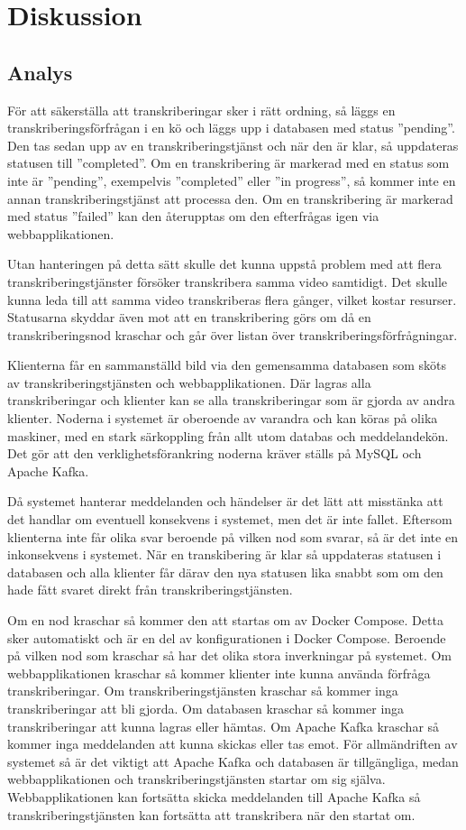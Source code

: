 \chapter{Diskussion}

\section{Analys}
För att säkerställa att transkriberingar sker i rätt ordning, så läggs en
transkriberingsförfrågan i en kö och läggs upp i databasen med status
''pending''. Den tas sedan upp av en transkriberingstjänst och när den är
klar, så uppdateras statusen till ''completed''. Om en transkribering är
markerad med en status som inte är ''pending'', exempelvis ''completed'' eller
''in progress'', så kommer inte en annan transkriberingstjänst att processa
den. Om en transkribering är markerad med status ''failed'' kan den återupptas
om den efterfrågas igen via webbapplikationen.

Utan hanteringen på detta sätt skulle det kunna uppstå problem med att flera
transkriberingstjänster försöker transkribera samma video samtidigt. Det
skulle kunna leda till att samma video transkriberas flera gånger, vilket
kostar resurser. Statusarna skyddar även mot att en transkribering görs om
då en transkriberingsnod kraschar och går över listan över
transkriberingsförfrågningar.

Klienterna får en sammanställd bild via den gemensamma databasen som sköts av
transkriberingstjänsten och webbapplikationen. Där lagras alla
transkriberingar och klienter kan se alla transkriberingar som är gjorda av
andra klienter. Noderna i systemet är oberoende av varandra
och kan köras på olika maskiner, med en stark särkoppling från allt utom
databas och meddelandekön. Det gör att den verklighetsförankring noderna
kräver ställs på MySQL och Apache Kafka.

Då systemet hanterar meddelanden och händelser är det lätt att misstänka att
det handlar om eventuell konsekvens i systemet, men det är inte fallet. 
Eftersom klienterna inte får olika svar beroende på vilken nod som svarar, så
är det inte en inkonsekvens i systemet. När en transkibering är klar så
uppdateras statusen i databasen och alla klienter får därav den nya statusen
lika snabbt som om den hade fått svaret direkt från transkriberingstjänsten.

Om en nod kraschar så kommer den att startas om av Docker Compose. Detta
sker automatiskt och är en del av konfigurationen i Docker Compose. Beroende
på vilken nod som kraschar så har det olika stora inverkningar på systemet.
Om webbapplikationen kraschar så kommer klienter inte kunna använda förfråga
transkriberingar. Om transkriberingstjänsten kraschar så kommer inga 
transkriberingar att bli gjorda. Om databasen kraschar så kommer inga
transkriberingar att kunna lagras eller hämtas. Om Apache Kafka kraschar så
kommer inga meddelanden att kunna skickas eller tas emot. För allmändriften
av systemet så är det viktigt att Apache Kafka och databasen är tillgängliga,
medan webbapplikationen och transkriberingstjänsten startar om sig själva. 
Webbapplikationen kan fortsätta skicka meddelanden till Apache Kafka så 
transkriberingstjänsten kan fortsätta att transkribera när den startat om.

